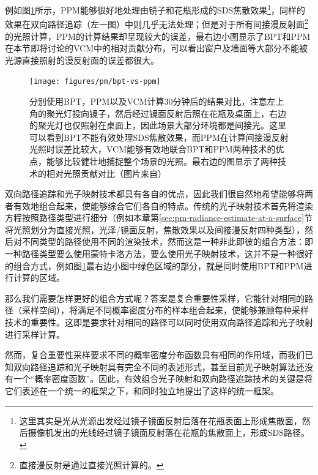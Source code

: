 例如图\ref{f:pm-bpt-vs-ppm}所示，PPM能够很好地处理由镜子和花瓶形成的SDS焦散效果\footnote{这里其实是光从光源出发经过镜子镜面反射后落在花瓶表面上形成焦散面，然后摄像机发出的光线经过镜子镜面反射落在花瓶的焦散面上，形成SDS路径。}，同样的效果在双向路径追踪（左一图）中则几乎无法处理；但是对于所有间接漫反射面\footnote{直接漫反射是通过直接光照计算的。}的光照计算，PPM的计算结果却呈现较大的误差，最右边小图显示了BPT和PPM在本节即将讨论的VCM中的相对贡献分布，可以看出窗户及墙面等大部分不能被光源直接照射的漫反射面的误差都很大。

\begin{figure}
\begin{fullwidth}	
	\texttt{[image: figures/pm/bpt-vs-ppm]}
	\caption{分别使用BPT，PPM以及VCM计算30分钟后的结果对比，注意左上角的聚光灯投向镜子，然后经过镜面反射后照在花瓶及桌面上，右边的聚光灯也仅照射在桌面上，因此场景大部分环境都是间接光。这里可以看到BPT不能有效处理SDS焦散效果，而PPM在计算间接漫反射光照时误差比较大，VCM能够有效地联合BPT和PPM两种技术的优点，能够比较健壮地捕捉整个场景的光照。最右边的图显示了两种技术的相对光照贡献对比（图片来自\cite{a:LightTransportSimulationwithVertexConnectionandMerging}）}
	\label{f:pm-bpt-vs-ppm}
\end{fullwidth}
\end{figure}

双向路径追踪和光子映射技术都具有各自的优点，因此我们很自然地希望能够将两者有效地组合起来，使能够综合它们各自的特点。传统的光子映射技术首先将渲染方程按照路径类型进行细分（例如本章第\ref{sec:pm-radiance-estimate-at-a-surface}节将光照划分为直接光照，光泽/镜面反射，焦散效果以及间接漫反射四种类型），然后对不同类型的路径使用不同的渲染技术，然而这是一种非此即彼的组合方法：即一种路径类型要么使用蒙特卡洛方法，要么使用光子映射技术，这并不是一种很好的组合方式，例如图\ref{f:pm-bpt-vs-ppm}最右边小图中绿色区域的部分，就是同时使用BPT和PPM进行计算的区域。

那么我们需要怎样更好的组合方式呢？答案是复合重要性采样，它能针对相同的路径（采样空间），将满足不同概率密度分布的样本组合起来，使能够兼顾每种采样技术的重要性。这即是要求针对相同的路径可以同时使用双向路径追踪和光子映射进行采样计算。

然而，复合重要性采样要求不同的概率密度分布函数具有相同的作用域，而我们已知双向路径追踪和光子映射具有完全不同的表述形式，甚至目前光子映射算法还没有一个“概率密度函数”。因此，有效组合光子映射和双向路径追踪技术的关键是将它们表述在一个统一的框架之下，\cite{a:LightTransportSimulationwithVertexConnectionandMerging}和\cite{a:APathSpaceExtensionforRobustLightTransportSimulation}同时独立地提出了这样的统一框架。

